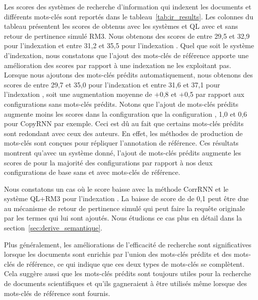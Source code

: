 Les scores des systèmes de recherche d'information qui indexent les documents et différents mots-clés sont reportés dans le tableau~\ref{tab:ir_results}.
Les colonnes du tableau présentent les scores de \map{} obtenus avec les systèmes \bm{} et QL avec et sans retour de pertinence simulé RM3.
Nous obtenons des scores de \map{} entre 29,5 et 32,9 pour l'indexation \tr{} et entre 31,2 et 35,5 pour l'indexation \trm{}.
Quel que soit le système d'indexation, nous constatons que l'ajout des mots-clés de référence apporte une amélioration des scores par rapport à une indexation ne les exploitant pas.
Lorsque nous ajoutons des mots-clés prédits automatiquement, nous obtenons des scores de \map{} entre 29,7 et 35,0 pour l'indexation \tr{} et entre 31,6 et 37,1 pour l'indexation \trm{}, soit une augmentation moyenne de $+$0,8 et $+$0,5 par rapport aux configurations sans mots-clés prédits.
Notons que l'ajout de mots-clés prédits augmente moins les scores dans la configuration \trm{} que la configuration \tr{}, 1,0 et 0,6 pour CopyRNN par exemple.
Ceci est dû au fait que certains mots-clés prédits sont redondant avec ceux des auteurs. En effet, les méthodes de production de mots-clés sont conçues pour répliquer l'annotation de référence.
Ces résultats montrent qu'avec un système donné, l'ajout de mots-clés prédits augmente les scores de \map{} pour la majorité des configurations par rapport à nos deux configurations de base sans et avec mots-clés de référence.

Nous constatons un cas où le score baisse avec la méthode CorrRNN et le système QL+RM3 pour l'indexation \trm{}. 
La baisse de score de \map{} de 0,1 peut être due au mécanisme de retour de pertinence simulé qui peut faire  la requête originale par les termes qui lui sont ajoutés. Nous étudions ce cas plus en détail dans la section~\ref{sec:derive_semantique}.



%
Plus généralement, les améliorations de l'efficacité de recherche sont significatives lorsque les documents sont enrichis par l'union des mots-clés prédits et des mots-clés de référence, ce qui indique que ces deux types de mots-clés se complètent.
Cela suggère aussi que les mots-clés prédits sont toujours utiles pour la recherche de documents scientifiques et qu'ils gagneraient à être utilisés même lorsque des mots-clés de référence sont fournis.


